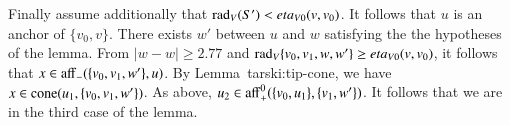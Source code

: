 \begin{tarskidata}
\begin{tarski}
\begin{proved}
Finally assume additionally that $\operatorname{rad}_V(S')<eta_{V0}(v,v_0)$.
It follows that $u$ is an anchor of $\{v_0,v\}$.
There exists $w'$ between $u$ and $w$
satisfying the the hypotheses of the lemma.
From $|w-w|\ge 2.77$ and $\operatorname{rad}_V\{v_0,v_1,w,w'\} \ge eta_{V0}(v,v_0)$,
it follows that $x\in {\operatorname{aff}}_-(\{v_0,v_1,w'\},u)$.  By Lemma~{tarski:tip-cone}, we have $x\in{\operatorname{cone}}(u_1,\{v_0,v_1,w'\})$.
As above, $u_2\in{\operatorname{aff}}_+^0(\{v_0,u_1\},\{v_1,w'\})$. 
It follows that we are in the third case of the lemma.
\swallowed\end{proved}
\end{tarski}





\begin{tarski}


\end{tarski}
\end{tarskidata}
